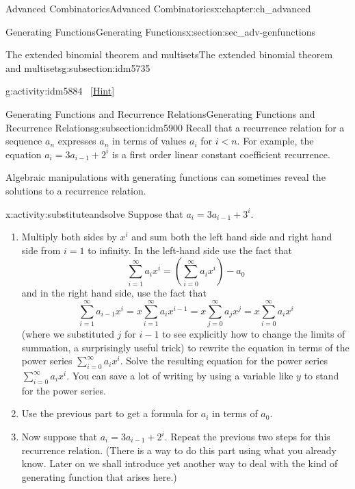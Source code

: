 \documentclass[oneside,10pt,]{book}
\numberwithin{equation}{chapter}
\newcommand{\lt}{<}
\begin{document}
\begin{chapterptx}{Advanced Combinatorics}{}{Advanced Combinatorics}{}{}{x:chapter:ch_advanced}
\begin{sectionptx}{Generating Functions}{}{Generating Functions}{}{}{x:section:sec_adv-genfunctions}
\begin{subsectionptx}{The extended binomial theorem and multisets}{}{The extended binomial theorem and multisets}{}{}{g:subsection:idm5735}
\begin{activity}{}{g:activity:idm5884}
\qquad~\hfill{\tiny\hyperlink{g:hint:idm5890-back}{[Hint]}}\end{activity}
\end{subsectionptx}
%
%
\typeout{************************************************}
\typeout{************************************************}
%
\begin{subsectionptx}{Generating Functions and Recurrence Relations}{}{Generating Functions and Recurrence Relations}{}{}{g:subsection:idm5900}
Recall that a recurrence relation for a sequence \(a_n\) expresses \(a_n\) in terms of values \(a_i\) for \(i\lt n\). For example, the equation \(a_i=3a_{i-1} +2^i\) is a first order linear constant coefficient recurrence.%
\par
Algebraic manipulations with generating functions can sometimes reveal the solutions to a recurrence relation.%
\begin{activity}{}{x:activity:substituteandsolve}%
Suppose that \(a_i=3a_{i-1} + 3^i\).%
\begin{enumerate}[font=\bfseries,label=(\alph*),ref=\alph*]
\item{}Multiply both sides by \(x^i\) and sum both the left hand side and right hand side from \(i=1\) to infinity.  In the left-hand side use the fact that%
\begin{equation*}
\sum_{i=1}^\infty a_ix^i = (\sum_{i=0}^\infty a_ix^i) - a_0
\end{equation*}
and in the right hand side, use the fact that%
\begin{equation*}
\sum_{i=1}^\infty a_{i-1}x^i = x\sum_{i=1}^\infty a_ix^{i-1}
=x\sum_{j=0}^\infty a_jx^j =x\sum_{i=0}^\infty a_ix^i
\end{equation*}
(where we substituted \(j\) for \(i-1\) to see explicitly how to change the limits of summation, a surprisingly useful trick) to rewrite the equation in terms of the power series \(\sum_{i=0}^\infty a_ix^i\).  Solve the resulting equation for the power series \(\sum_{i=0}^\infty a_ix^i\). You can save a lot of writing by using a variable like \(y\) to stand for the power series.%
\item{}Use the previous part to get a formula for \(a_i\) in terms of \(a_0\).%
\item{}Now suppose that \(a_i=3a_{i-1} + 2^i\).  Repeat the previous two steps for this recurrence relation.  (There is a way to do this part using what you already know.  Later on we shall introduce yet another way to deal with the kind of generating function that arises here.)%

\end{enumerate}
\end{activity}
\end{subsectionptx}
\end{sectionptx}
\end{chapterptx}
\end{document}
